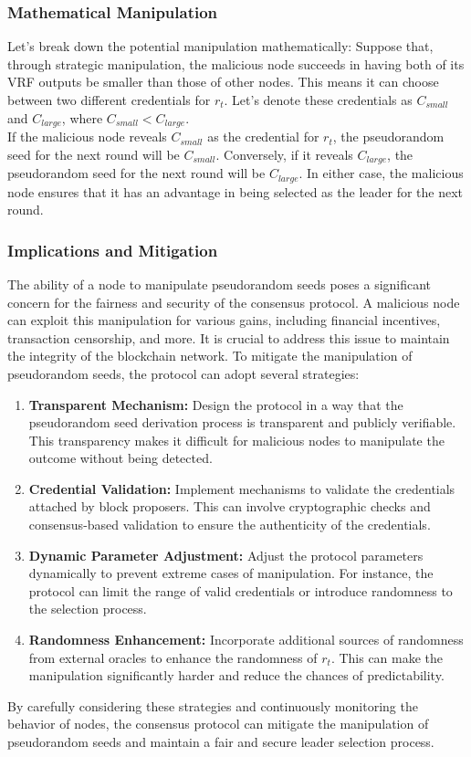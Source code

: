 \subsubsection{Mathematical Manipulation}
Let's break down the potential manipulation mathematically: Suppose that, through strategic manipulation, the malicious node succeeds in having both of its VRF outputs be smaller than those of other nodes. This means it can choose between two different credentials for $r_t$. Let's denote these credentials as \(C_{small}\) and \(C_{large}\), where \(C_{small} < C_{large}\).\\
If the malicious node reveals \(C_{small}\) as the credential for $r_t$, the pseudorandom seed for the next round will be \(C_{small}\). Conversely, if it reveals \(C_{large}\), the pseudorandom seed for the next round will be \(C_{large}\). In either case, the malicious node ensures that it has an advantage in being selected as the leader for the next round.

\subsubsection{Implications and Mitigation}
The ability of a node to manipulate pseudorandom seeds poses a significant concern for the fairness and security of the consensus protocol. A malicious node can exploit this manipulation for various gains, including financial incentives, transaction censorship, and more. It is crucial to address this issue to maintain the integrity of the blockchain network.
To mitigate the manipulation of pseudorandom seeds, the protocol can adopt several strategies:
\begin{enumerate}
    \item \textbf{Transparent Mechanism:} Design the protocol in a way that the pseudorandom seed derivation process is transparent and publicly verifiable. This transparency makes it difficult for malicious nodes to manipulate the outcome without being detected.
    \item \textbf{Credential Validation:} Implement mechanisms to validate the credentials attached by block proposers. This can involve cryptographic checks and consensus-based validation to ensure the authenticity of the credentials.
    \item \textbf{Dynamic Parameter Adjustment:} Adjust the protocol parameters dynamically to prevent extreme cases of manipulation. For instance, the protocol can limit the range of valid credentials or introduce randomness to the selection process.
    \item \textbf{Randomness Enhancement:} Incorporate additional sources of randomness from external oracles to enhance the randomness of $r_t$. This can make the manipulation significantly harder and reduce the chances of predictability.
\end{enumerate}
By carefully considering these strategies and continuously monitoring the behavior of nodes, the consensus protocol can mitigate the manipulation of pseudorandom seeds and maintain a fair and secure leader selection process.

